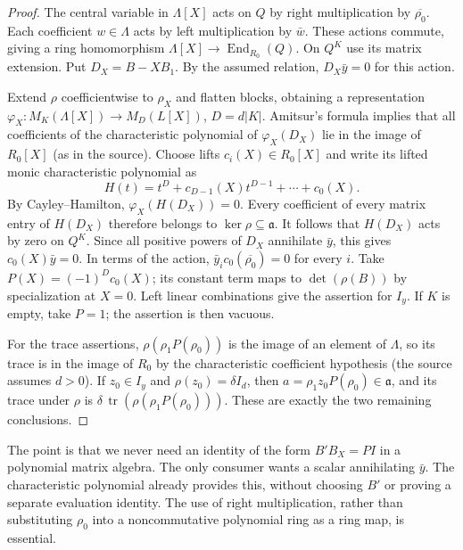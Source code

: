 \documentclass[11pt]{article}
\begin{document}
\begin{proof}
The central variable in $\Lambda[X]$ acts on $Q$ by right multiplication by $\overline{\rho_0}$. Each coefficient $w\in\Lambda$ acts by left multiplication by $\bar w$. These actions commute, giving a ring homomorphism $\Lambda[X]\to\operatorname{End}_{R_0}(Q)$. On $Q^K$ use its matrix extension. Put $D_X=B-XB_1$. By the assumed relation, $D_X\bar y=0$ for this action.

Extend $\rho$ coefficientwise to $\rho_X$ and flatten blocks, obtaining a representation $\varphi_X:M_K(\Lambda[X])\to M_D(L[X])$, $D=d|K|$. Amitsur's formula implies that all coefficients of the characteristic polynomial of $\varphi_X(D_X)$ lie in the image of $R_0[X]$ (as in the source). Choose lifts $c_i(X)\in R_0[X]$ and write its lifted monic characteristic polynomial as
\[
 H(t)=t^D+c_{D-1}(X)t^{D-1}+\cdots+c_0(X).
\]
By Cayley--Hamilton, $\varphi_X(H(D_X))=0$. Every coefficient of every matrix entry of $H(D_X)$ therefore belongs to $\ker\rho\subseteq\mathfrak a$. It follows that $H(D_X)$ acts by zero on $Q^K$. Since all positive powers of $D_X$ annihilate $\bar y$, this gives $c_0(X)\bar y=0$. In terms of the action, $\bar y_i c_0(\overline{\rho_0})=0$ for every $i$. Take $P(X)=(-1)^D c_0(X)$; its constant term maps to $\det(\rho(B))$ by specialization at $X=0$. Left linear combinations give the assertion for $I_y$. If $K$ is empty, take $P=1$; the assertion is then vacuous.

For the trace assertions, $\rho(\rho_1 P(\rho_0))$ is the image of an element of $\Lambda$, so its trace is in the image of $R_0$ by the characteristic coefficient hypothesis (the source assumes $d>0$). If $z_0\in I_y$ and $\rho(z_0)=\delta I_d$, then $a=\rho_1 z_0 P(\rho_0)\in\mathfrak a$, and its trace under $\rho$ is $\delta\,\operatorname{tr}(\rho(\rho_1P(\rho_0)))$. These are exactly the two remaining conclusions.
\end{proof}
The point is that we never need an identity of the form $B'B_X=P I$ in a polynomial matrix algebra. The only consumer wants a scalar annihilating $\bar y$. The characteristic polynomial already provides this, without choosing $B'$ or proving a separate evaluation identity. The use of right multiplication, rather than substituting $\rho_0$ into a noncommutative polynomial ring as a ring map, is essential.
\end{document}

